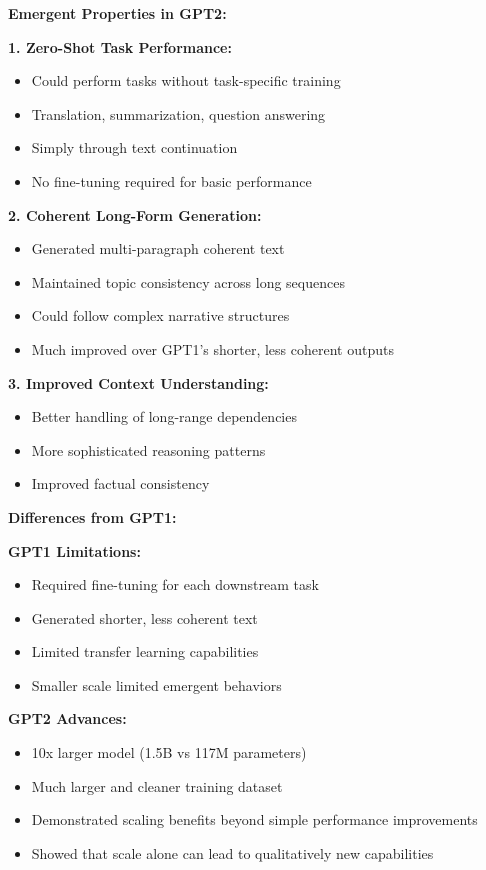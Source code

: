 \documentclass[12pt]{article}
\newcommand{\explanation}[1]{{\color{explanationcolor}#1}}
\begin{document}
\begin{enumerate}
\begin{enumerate}[(a)]
    \explanation{
    \textbf{Emergent Properties in GPT2:}
    
    \textbf{1. Zero-Shot Task Performance:}
    \begin{itemize}
        \item Could perform tasks without task-specific training
        \item Translation, summarization, question answering
        \item Simply through text continuation
        \item No fine-tuning required for basic performance
    \end{itemize}
    
    \textbf{2. Coherent Long-Form Generation:}
    \begin{itemize}
        \item Generated multi-paragraph coherent text
        \item Maintained topic consistency across long sequences
        \item Could follow complex narrative structures
        \item Much improved over GPT1's shorter, less coherent outputs
    \end{itemize}
    
    \textbf{3. Improved Context Understanding:}
    \begin{itemize}
        \item Better handling of long-range dependencies
        \item More sophisticated reasoning patterns
        \item Improved factual consistency
    \end{itemize}
    
    \textbf{Differences from GPT1:}
    
    \textbf{GPT1 Limitations:}
    \begin{itemize}
        \item Required fine-tuning for each downstream task
        \item Generated shorter, less coherent text
        \item Limited transfer learning capabilities
        \item Smaller scale limited emergent behaviors
    \end{itemize}
    
    \textbf{GPT2 Advances:}
    \begin{itemize}
        \item 10x larger model (1.5B vs 117M parameters)
        \item Much larger and cleaner training dataset
        \item Demonstrated scaling benefits beyond simple performance improvements
        \item Showed that scale alone can lead to qualitatively new capabilities
    \end{itemize}
    
}
\end{enumerate}
\end{enumerate}
\end{document}
